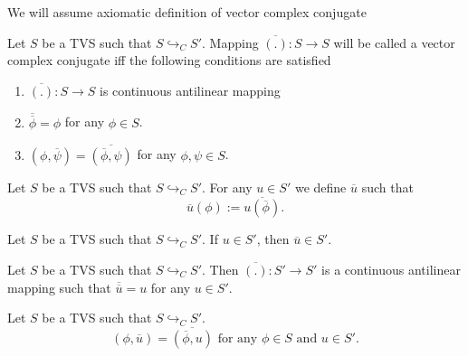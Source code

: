 \documentclass[main.tex]{subfiles}
\begin{document}
%

We will assume axiomatic definition of vector complex conjugate 

\begin{definition}
Let $S$ be a TVS such that $S \hookrightarrow_C S'$. Mapping $\overline{(.)}: S\to S$ will be called a vector complex conjugate iff the following conditions are satisfied
\begin{enumerate}
\item $\overline{(.)}: S\to S$ is continuous antilinear mapping
\item $\overline{\overline{\phi}} = \phi$ for any $\phi\in S$.
\item $(\phi, \overline{\psi}) = \overline{(\overline{\phi}, \psi)}$ for any $\phi,\psi\in S$.
\end{enumerate}
\end{definition}

\begin{definition}
Let $S$ be a TVS such that $S \hookrightarrow_C S'$. For any $u\in S'$ we define $\overline{u}$ such that
\begin{equation}
\overline{u}(\phi) := \overline{u(\overline{\phi})}.
\end{equation}
\end{definition}

\begin{corollary}
Let $S$ be a TVS such that $S \hookrightarrow_C S'$. If $u\in S'$, then $\overline{u}\in S'$.
\end{corollary}
\begin{corollary}
Let $S$ be a TVS such that $S \hookrightarrow_C S'$. Then $\overline{(.)}: S'\to S'$ is a continuous antilinear mapping such that $\overline{\overline{u}} = u$ for any $u\in S'$.
\end{corollary}
\begin{corollary}
Let $S$ be a TVS such that $S \hookrightarrow_C S'$.
\begin{equation}
(\phi, \overline{u}) = \overline{(\overline{\phi}, u)} \text{ for any } \phi\in S \text{ and } u\in S'.
\end{equation}
\end{corollary}
\end{document}
